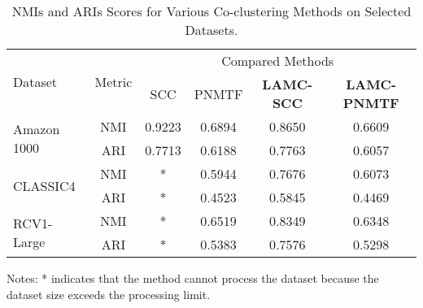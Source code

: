 \begin{table*}[!htbp]
    \centering
    \caption{NMIs and ARIs Scores for Various Co-clustering Methods on Selected Datasets.}
    \label{tab:evaluation-metrics}
    \begin{tabular}{@{} l c cccc @{}}
        \toprule
        \multirow{2}{*}{Dataset}     & \multirow{2}{*}{Metric} & \multicolumn{4}{c}{Compared Methods}                                                                                                        \\
        \cmidrule{3-6}
                                     &                         & SCC \cite{dhillon2001CoclusteringDocumentsWords} & PNMTF \cite{chen2023ParallelNonNegativeMatrix} & \textbf{LAMC-SCC} & \textbf{LAMC-PNMTF} \\
        \midrule
        \multirow{2}{*}{Amazon 1000} & NMI                     & 0.9223                                           & 0.6894                                         & 0.8650            & 0.6609              \\
                                     & ARI                     & 0.7713                                           & 0.6188                                         & 0.7763            & 0.6057              \\
        \multirow{2}{*}{CLASSIC4}    & NMI                     & *                                                & 0.5944                                         & 0.7676            & 0.6073              \\
                                     & ARI                     & *                                                & 0.4523                                         & 0.5845            & 0.4469              \\
        \multirow{2}{*}{RCV1-Large}  & NMI                     & *                                                & 0.6519                                         & 0.8349            & 0.6348              \\
                                     & ARI                     & *                                                & 0.5383                                         & 0.7576            & 0.5298              \\
        \bottomrule
    \end{tabular}
    \begin{tablenotes}
        \small
        \item Notes: * indicates that the method cannot process the dataset because the dataset size exceeds the processing limit.
    \end{tablenotes}
\end{table*}

